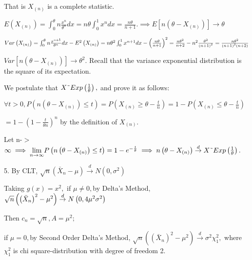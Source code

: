 \documentclass{ctexart}
\def\TEXTsymbol#1{\mbox{$#1$}}%
\begin{document}
That is $X_{\left( n\right) }$ is a complete statistic.

$E\left( X_{\left( n\right) }\right) =\int_{0}^{\theta }n\frac{x^{n}}{\theta
^{n}}dx=n\theta \int_{0}^{1}x^{n}dx=\frac{n\theta }{n+1}.\implies E\left[
n\left( \theta -X_{\left( n\right) }\right) \right] \rightarrow \theta $

$Var\left( X_{\left( n\right) }\right) =\int_{0}^{\theta }n\frac{x^{n+1}}{%
\theta ^{n}}dx-E^{2}\left( X_{\left( n\right) }\right) =n\theta
^{2}\int_{0}^{1}x^{n+1}dx-\left( \frac{n\theta }{n+1}\right) ^{2}=\frac{%
n\theta ^{2}}{n+2}-n^{2}\frac{\theta ^{2}}{\left( n+1\right) ^{2}}=\frac{%
n\theta ^{2}}{\left( n+1\right) ^{2}\left( n+2\right) }$

$Var\left[ n\left( \theta -X_{\left( n\right) }\right) \right] \rightarrow
\theta ^{2}.$ Recall that the variance exponential distribution is the
square of its expectation.

We postulate that $X\symbol{126}Exp\left( \frac{1}{\theta }\right) ,$ and
prove it as follows:

$\forall t>0,P\left( n\left( \theta -X_{\left( n\right) }\right) \leq
t\right) =P\left( X_{\left( n\right) }\geq \theta -\frac{t}{n}\right)
=1-P\left( X_{\left( n\right) }\leq \theta -\frac{t}{n}\right) $

$=1-\left( 1-\frac{t}{\theta n}\right) ^{n}$ by the definition of $X_{\left(
n\right) }.$

Let n-\TEXTsymbol{>}$\infty \implies \underset{n\rightarrow \infty }{\lim }%
P\left( n\left( \theta -X_{\left( n\right) }\right) \leq t\right) =1-e^{-%
\frac{t}{\theta }}\implies n\left( \theta -X_{\left( n\right) }\right) 
\overset{d}{\rightarrow }X\symbol{126}Exp\left( \frac{1}{\theta }\right) .$

5. By CLT, $\sqrt{n}\left( \bar{X}_{n}-\mu \right) \overset{d}{\rightarrow }%
N\left( 0,\sigma ^{2}\right) $

Taking $g\left( x\right) =x^{2},$ if $\mu \neq 0,$by Delta's Method, $\sqrt{n%
}\left( \left( \bar{X}_{n}\right) ^{2}-\mu ^{2}\right) \overset{d}{%
\rightarrow }N\left( 0,4\mu ^{2}\sigma ^{2}\right) $

Then $c_{n}=\sqrt{n},A=\mu ^{2};$

if $\mu =0,$by Second Order Delta's Method, $\sqrt{n}\left( \left( \bar{X}%
_{n}\right) ^{2}-\mu ^{2}\right) \overset{d}{\rightarrow }\sigma ^{2}\chi
_{1}^{2},$ where $\chi _{1}^{2}$ is chi square-distribution with degree of
freedom 2.

\qquad
\end{document}
